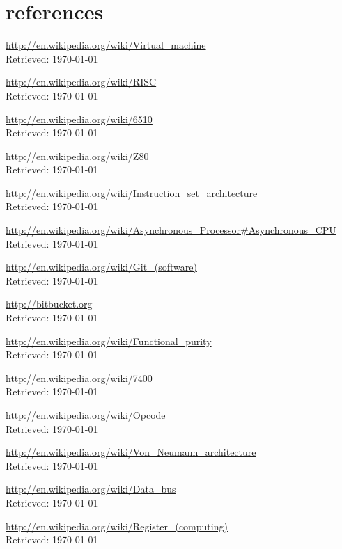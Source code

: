 \documentclass{article}
\begin{document}
\section{references}
\begin{thebibliography}{}

{\url{http://en.wikipedia.org/wiki/Virtual_machine}\\
Retrieved: \today}

{\url{http://en.wikipedia.org/wiki/RISC}\\
Retrieved: \today}

{\url{http://en.wikipedia.org/wiki/6510}\\
Retrieved: \today}

{\url{http://en.wikipedia.org/wiki/Z80}\\
Retrieved: \today}

{\url{http://en.wikipedia.org/wiki/Instruction_set_architecture}\\
Retrieved: \today}

{\url{http://en.wikipedia.org/wiki/Asynchronous_Processor#Asynchronous_CPU}\\
Retrieved: \today}

{\url{http://en.wikipedia.org/wiki/Git_(software)}\\
Retrieved: \today}

{\url{http://bitbucket.org}\\
Retrieved: \today}

{\url{http://en.wikipedia.org/wiki/Functional_purity}\\
Retrieved: \today}

{\url{http://en.wikipedia.org/wiki/7400}\\
Retrieved: \today}

{\url{http://en.wikipedia.org/wiki/Opcode}\\
Retrieved: \today}

{\url{http://en.wikipedia.org/wiki/Von_Neumann_architecture}\\
Retrieved: \today}

{\url{http://en.wikipedia.org/wiki/Data_bus}\\
Retrieved: \today}

{\url{http://en.wikipedia.org/wiki/Register_(computing)}\\
Retrieved: \today}


\end{thebibliography}
\end{document}
